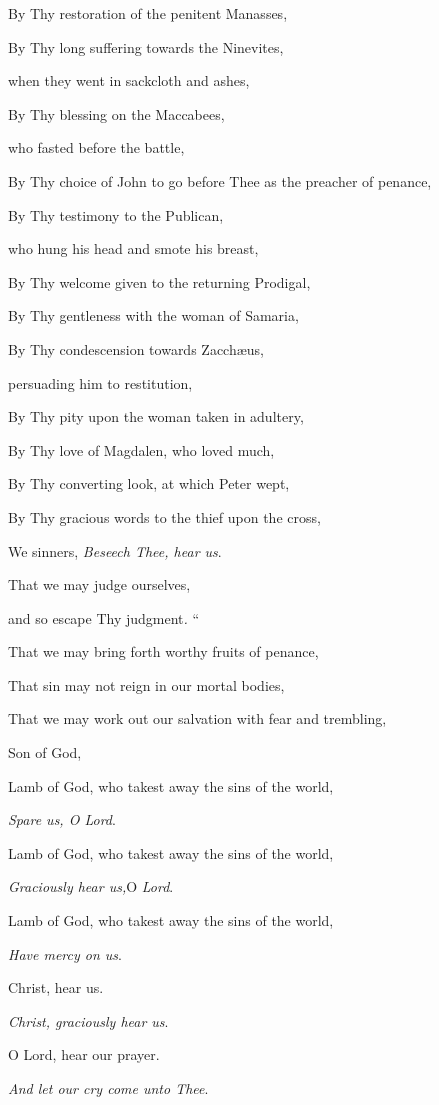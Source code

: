 By Thy restoration of the penitent Manasses,

By Thy long suffering towards the Ninevites,

when they went
in sackcloth and ashes,

By Thy blessing on the Maccabees,

who fasted
before the battle,

By Thy choice of John to go before Thee as the preacher of penance,

By Thy testimony to the Publican,

who hung his
head and smote his breast,

By Thy welcome given to the returning Prodigal,

By Thy gentleness with the woman of Samaria,

By Thy condescension towards Zacchæus,

persuading him
to restitution,

By Thy pity upon the woman taken in adultery,

By Thy love of Magdalen, who loved much,

By Thy converting look, at which Peter wept,

By Thy gracious words to the thief upon the cross,

We sinners,
\emph{Beseech Thee, hear us}. 

That we may judge ourselves,

and so escape
Thy judgment\emph{.}
``

That we may bring forth worthy fruits of penance,

That sin may not reign in our mortal bodies,

That we may work out our salvation with fear and trembling,

Son of God,

Lamb of God, who takest away the
sins of the world,

\emph{Spare us, O Lord}.

Lamb of God, who takest away the sins of the world,

\emph{Graciously hear us,}O \emph{Lord}.

Lamb of God, who takest away the sins of the world,

\emph{Have mercy on us}.

Christ, hear us.

\emph{Christ, graciously hear us}.

O Lord, hear our prayer.

\emph{And let our cry come unto Thee}.

